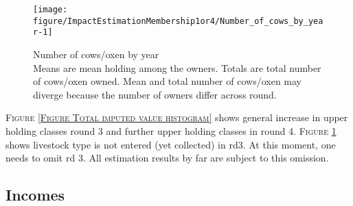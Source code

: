 \begin{Schunk}
\begin{figure}

{\centering \texttt{[image: figure/ImpactEstimationMembership1or4/Number\_of\_cows\_by\_year-1]} 

}

\caption{Number of cows/oxen by year\\ {\footnotesize Means are mean holding among the owners. Totals are total number of cows/oxen owned. Mean and total number of cows/oxen may diverge because the number of owners differ across round.\setlength{\baselineskip}{8pt}}}\label{Figure Number of cows by year}
\end{figure}
\end{Schunk}
\begin{palepinkleftbar}
\begin{finding}
\textsc{\small Figure \ref{Figure Total imputed value histogram}} shows general increase in upper holding classes round 3 and further upper holding classes in round 4. \textsc{\small Figure \ref{Figure Number of cows by year}} shows livestock type is not entered (yet collected) in rd3. At this moment, one needs to omit rd 3. All estimation results by far are subject to this omission.
\end{finding}
\end{palepinkleftbar}

\clearpage
\subsection{Incomes}


